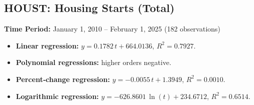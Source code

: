 \documentclass[11pt,a4paper]{article}
\begin{document}
\clearpage
\subsection{HOUST: Housing Starts (Total)}
\textbf{Time Period:} January 1, 2010 – February 1, 2025 (182 observations)

\begin{itemize}
  \item \textbf{Linear regression:} \(y = 0.1782\,t + 664.0136\), \(R^2 = 0.7927\).
  \item \textbf{Polynomial regressions:} higher orders negative.
  \item \textbf{Percent‐change regression:} \(y = -0.0055\,t + 1.3949\), \(R^2 = 0.0010\).
  \item \textbf{Logarithmic regression:} \(y = -626.8601\,\ln(t) + 234.6712\), \(R^2 = 0.6514\).
\end{itemize}
\end{document}
